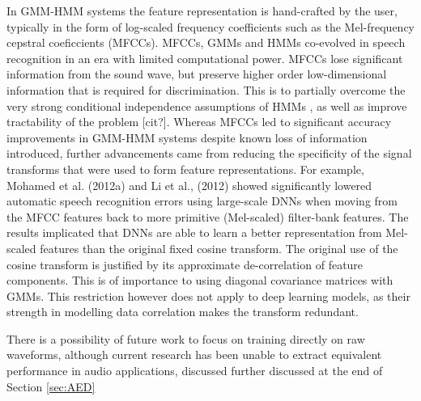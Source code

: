 \documentclass[12pt]{llncs}
\begin{document}
In GMM-HMM systems the feature representation is hand-crafted by the user, typically in the form of log-scaled frequency coefficients such as the Mel-frequency cepstral coeficcients (MFCCs). MFCCs, GMMs and HMMs co-evolved in speech recognition in an era with limited computational power. MFCCs lose significant information from the sound wave, but preserve higher order low-dimensional information that is required for discrimination. This is to partially overcome the very strong conditional independence assumptions of HMMs \cite{mohamed2012acoustic}, as well as improve tractability of the problem [cit?].
Whereas MFCCs led to significant accuracy improvements in GMM-HMM systems despite known loss of information introduced, further advancements came from reducing the specificity of the signal transforms that were used to form feature representations.
For example, Mohamed et al. (2012a) \cite[firstExampleMovingGMMsectionofHMM/GMMtoDNN]{mohamed2012acoustic} and Li et al., (2012) showed significantly lowered automatic speech recognition errors using large-scale DNNs when moving from the MFCC features back to more primitive (Mel-scaled) filter-bank features. The results implicated that DNNs are able to learn a better representation from Mel-scaled features than the original fixed cosine transform. The original use of the cosine transform is justified by its approximate de-correlation of feature components. This is of importance to using diagonal covariance matrices with GMMs. This restriction however does not apply to deep learning models, as their strength in modelling data correlation makes the transform redundant. 

There is a possibility of future work to focus on training directly on raw waveforms, although current research has been unable to extract equivalent performance in audio applications, discussed further discussed at the end of Section \ref{sec:AED}
\end{document}
